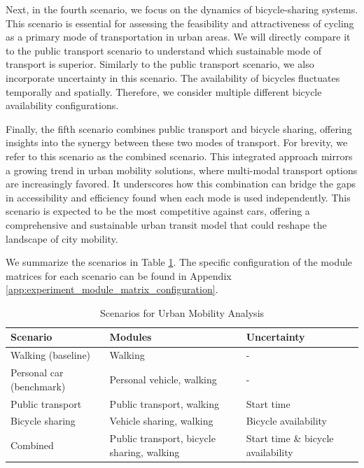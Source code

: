 Next, in the fourth scenario, we focus on the dynamics of bicycle-sharing systems. 
This scenario is essential for assessing the feasibility and attractiveness of cycling as a primary mode of transportation in urban areas. 
We will directly compare it to the public transport scenario to understand which sustainable mode of transport is superior.
Similarly to the public transport scenario, we also incorporate uncertainty in this scenario.
The availability of bicycles fluctuates temporally and spatially.
Therefore, we consider multiple different bicycle availability configurations.

Finally, the fifth scenario combines public transport and bicycle sharing, offering insights into the synergy between these two modes of transport.
For brevity, we refer to this scenario as the combined scenario.
This integrated approach mirrors a growing trend in urban mobility solutions, where multi-modal transport options are increasingly favored. 
It underscores how this combination can bridge the gaps in accessibility and efficiency found when each mode is used independently. 
This scenario is expected to be the most competitive against cars, offering a comprehensive and sustainable urban transit model that could reshape the landscape of city mobility.

We summarize the scenarios in Table \ref{table:scenarios}.
The specific configuration of the module matrices for each scenario can be found in Appendix \ref{app:experiment_module_matrix_configuration}.

\begin{table}[h]
\centering
\begin{tabular}{|p{4cm}|p{5cm}|p{4cm}|}
\hline
\textbf{Scenario} & \textbf{Modules} & \textbf{Uncertainty} \\
\hline
Walking (baseline) & Walking & - \\
\hline
Personal car (benchmark) & Personal vehicle, walking & - \\
\hline
Public transport & Public transport, walking & Start time \\
\hline
Bicycle sharing & Vehicle sharing, walking & Bicycle availability \\
\hline
Combined & Public transport, bicycle sharing, walking & Start time \& bicycle availability \\
\hline
\end{tabular}
\caption{Scenarios for Urban Mobility Analysis}
\label{table:scenarios}
\end{table}


